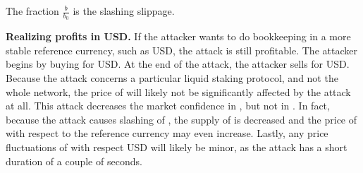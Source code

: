 The fraction $\frac{b}{b_0}$ is the slashing slippage.

\noindent
\textbf{Realizing profits in USD.}
If the attacker wants to do bookkeeping in a more stable reference currency,
such as USD, the attack is still profitable. The attacker begins by buying
\asset for USD. At the end of the attack, the attacker sells \asset for USD.
Because the attack concerns a particular liquid staking protocol, and
not the whole \asset network, the price of \asset will likely not
be significantly affected by the attack at all.
This attack decreases the market confidence in \stasset,
but not in \asset.
In fact, because
the attack causes slashing of \asset, the supply of \asset is decreased
and the price of \asset with respect to the reference currency may
even increase.
Lastly, any price fluctuations of \asset with respect USD will likely be
minor, as the attack has a short duration of a couple of seconds.
